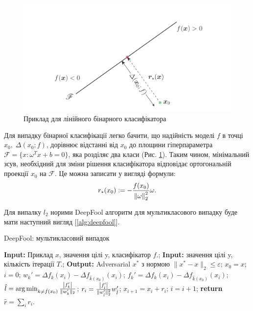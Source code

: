 \documentclass[a4paper,12pt]{extreport}
\renewcommand{\algorithmicrequire}{\textbf{Input: }}
\renewcommand{\algorithmicensure}{\textbf{Output: }}
\newcommand{\algorithmreturn}{\textbf{return }}
\newcommand{\tran}{^{T}}
\begin{document}
	\begin{figure}[h]
		\centering
		\includegraphics[width=\textwidth]{resources/deepfool.jpg}
		\caption{Приклад для лінійного бінарного класифікатора \cite{moosavidezfooli2015deepfool}}
		\label{fig:dfhyperline}
	\end{figure}

	Для випадку бінарної класифікації легко бачити, що надійність моделі $f$ в точці $ x_{0}, \; \Delta(x_{0}; f)$, дорівнює відстанні від $x_{0}$ до площини гіперпараметра $\mathscr{F} = \{ x: \omega\tran x + b = 0 \}$, яка розділяє два класи (Рис. \ref{fig:dfhyperline}). Таким чином, мінімальний зсув, необхідний для зміни рішення класифікатора відповідає ортогональній проекції $x_{0}$ на $\mathscr{F}$. Це можна записати у вигляді формули:
	\begin{align}
		r_{*}(x_{0}) := -\frac{f(x_{0})}{\norm{\omega}_{2}^{2}} \omega .
	\end{align}

	Для випалку $l_2$ норими DeepFool алгоритм для мультикласового випадку буде мати наступний вигляд [\ref{alg:deepfool}].

	\begin{algorithm}
		\caption{DeepFool: мультикласовий випадок}
		\label{alg:deepfool}
		\begin{algorithmic}[1]
			\State \algorithmicrequire{Приклад $x$, значення цілі y, класифікатор $f$.};
			\State \algorithmicrequire{значення цілі y, кількість ітерації $T$.};
			\State \algorithmicensure{ Adversarial $x^{*}$ з нормою $\|x^{*} - x\|_{2} \leq \varepsilon $};
			\State $x_0 = x$; $i = 0$; 
					\State $ w_{k}' = \Delta f_k(x_i) - \Delta f_{\hat{k}(x_0)} (x_i)$;
					\State $ f_{k}' = \Delta f_k(x_i) - \Delta f_{\hat{k}(x_0)} (x_i)$;
				\EndFor
				\State $\hat{l} = \arg \min_{k \neq \hat{f}(x_0)} \frac{\abs{f_{k}'}}{\|w_{k}'\|_2}$;
				\State $r_i = \frac{\abs{f_{\hat{l}}'}}{\|w_{\hat{l}}'\|_{2}^{2}} w_{\hat{l}}'$;
				\State $x_{i+1} = x_i + r_i$;
				\State $i = i + 1$;
			\EndWhile
			\State \algorithmreturn{$\hat{r} = \sum_{i} r_i $}.
		\end{algorithmic}
	\end{algorithm}
	
\end{document}
